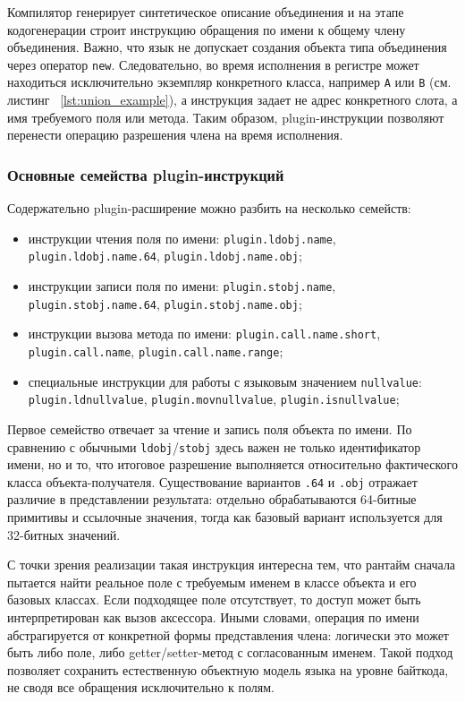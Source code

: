 Компилятор генерирует синтетическое описание объединения и на этапе кодогенерации строит инструкцию
обращения по имени к общему члену объединения. Важно, что язык не допускает создания объекта типа
объединения через оператор \texttt{new}. Следовательно, во время исполнения в регистре может находиться
исключительно экземпляр конкретного класса, например \texttt{A} или \texttt{B} (см. листинг ~\ref{lst:union_example}), а инструкция задает не адрес
конкретного слота, а имя требуемого поля или метода. Таким образом, plugin-инструкции позволяют
перенести операцию разрешения члена на время исполнения.

\subsubsection{Основные семейства plugin-инструкций}

Содержательно plugin-расширение можно разбить на несколько семейств:
\begin{itemize}
    \item инструкции чтения поля по имени:
    \texttt{plugin.ldobj.name}, \newline \texttt{plugin.ldobj.name.64}, \texttt{plugin.ldobj.name.obj};
    \item инструкции записи поля по имени:
    \texttt{plugin.stobj.name}, \newline \texttt{plugin.stobj.name.64}, \texttt{plugin.stobj.name.obj};
    \item инструкции вызова метода по имени: \texttt{plugin.call.name.short}, \newline \texttt{plugin.call.name},
    \texttt{plugin.call.name.range};
    \item специальные инструкции для работы с языковым значением \texttt{nullvalue}:
    \texttt{plugin.ldnullvalue}, \texttt{plugin.movnullvalue}, \texttt{plugin.isnullvalue};
\end{itemize}

Первое семейство отвечает за чтение и запись поля объекта по имени. По сравнению с обычными
\texttt{ldobj}/\texttt{stobj} здесь важен не только идентификатор имени, но и то, что
итоговое разрешение выполняется относительно фактического класса объекта-получателя. Существование
вариантов \texttt{.64} и \texttt{.obj} отражает различие в представлении результата: отдельно
обрабатываются 64-битные примитивы и ссылочные значения, тогда как базовый вариант используется
для 32-битных значений.

С точки зрения реализации такая инструкция интересна тем, что рантайм сначала пытается найти реальное
поле с требуемым именем в классе объекта и его базовых классах. Если подходящее поле отсутствует,
то доступ может быть интерпретирован как вызов аксессора. Иными словами, операция по имени
абстрагируется от конкретной формы представления члена: логически это может быть либо поле, либо
getter/setter-метод с согласованным именем. Такой подход позволяет сохранить естественную объектную
модель языка на уровне байткода, не сводя все обращения исключительно к полям.

